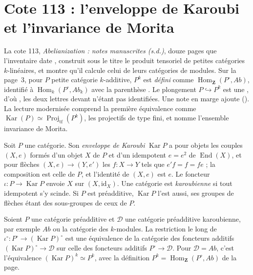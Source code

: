 \section[Cote 113 : l'enveloppe de Karoubi et l'invariance de Morita]{Cote 113 : l'enveloppe de Karoubi et l'invariance de Morita\protect{}}\label{sec:113}

La cote 113, \emph{Abelianization : notes manuscrites (s.d.)}, douze pages que l'inventaire date \q{[à partir de 1982]}, construit sous le titre  le produit tensoriel de petites catégories $k$-linéaires, et montre qu'il calcule celui de leurs catégories de modules. Sur la page~3, pour $P$ petite catégorie $k$-additive, $P^k$ est \emph{défini} comme $\operatorname{Hom}_{\mathbf Z}(P^\circ, Ab)$, identifié à $\operatorname{Hom}_k(P^\circ, Ab_k)$ avec la parenthèse . Le plongement $P \hookrightarrow P^k$ est une , d'où , les deux lettres devant  n'étant pas identifiées. Une note en marge ajoute  (). La lecture modernisée comprend la première équivalence comme $\operatorname{Kar}(P) \simeq \operatorname{Proj}_{\mathrm{tf}}(P^k)$, les projectifs de type fini, et nomme l'ensemble invariance de Morita.

\begin{definition}
Soit $P$ une catégorie. Son \emph{enveloppe de Karoubi} $\operatorname{Kar} P$ a pour objets les couples $(X, e)$ formés d'un objet $X$ de $P$ et d'un idempotent $e = e^2$ de $\operatorname{End}(X)$, et pour flèches $(X, e) \to (Y, e')$ les $f : X \to Y$ tels que $e' f = f = f e$ ; la composition est celle de $P$, et l'identité de $(X, e)$ est $e$. Le foncteur $\iota : P \to \operatorname{Kar} P$ envoie $X$ sur $(X, \mathrm{id}_X)$. Une catégorie est \emph{karoubienne} si tout idempotent s'y scinde. Si $P$ est préadditive, $\operatorname{Kar} P$ l'est aussi, ses groupes de flèches étant des sous-groupes de ceux de $P$.
\end{definition}

\begin{enonce}
Soient $P$ une catégorie préadditive et $\mathcal D$ une catégorie préadditive karoubienne, par exemple $Ab$ ou la catégorie des $k$-modules. La restriction le long de $\iota^\circ : P^\circ \to (\operatorname{Kar} P)^\circ$ est une équivalence de la catégorie des foncteurs additifs $(\operatorname{Kar} P)^\circ \to \mathcal D$ sur celle des foncteurs additifs $P^\circ \to \mathcal D$. Pour $\mathcal D = Ab$, c'est l'équivalence $(\operatorname{Kar} P)^k \simeq P^k$, avec la définition $P^k = \operatorname{Hom}_{\mathbf Z}(P^\circ, Ab)$ de la page.
\end{enonce}

